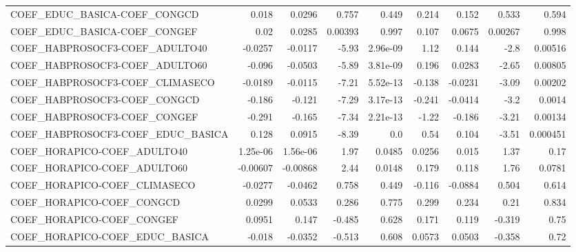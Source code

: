 \begin{tabular}{lrrrrrrrr}
COEF\_EDUC\_BASICA-COEF\_CONGCD         &       0.018 &       0.0296 &   0.757 &    0.449 &      0.214 &       0.152 &        0.533 &         0.594 \\
COEF\_EDUC\_BASICA-COEF\_CONGEF         &        0.02 &       0.0285 & 0.00393 &    0.997 &      0.107 &      0.0675 &      0.00267 &         0.998 \\
COEF\_HABPROSOCF3-COEF\_ADULTO40       &     -0.0257 &      -0.0117 &   -5.93 & 2.96e-09 &       1.12 &       0.144 &         -2.8 &       0.00516 \\
COEF\_HABPROSOCF3-COEF\_ADULTO60       &      -0.096 &      -0.0503 &   -5.89 & 3.81e-09 &      0.196 &      0.0283 &        -2.65 &       0.00805 \\
COEF\_HABPROSOCF3-COEF\_CLIMASECO      &     -0.0189 &      -0.0115 &   -7.21 & 5.52e-13 &     -0.138 &     -0.0231 &        -3.09 &       0.00202 \\
COEF\_HABPROSOCF3-COEF\_CONGCD         &      -0.186 &       -0.121 &   -7.29 & 3.17e-13 &     -0.241 &     -0.0414 &         -3.2 &        0.0014 \\
COEF\_HABPROSOCF3-COEF\_CONGEF         &      -0.291 &       -0.165 &   -7.34 & 2.21e-13 &      -1.22 &      -0.186 &        -3.21 &       0.00134 \\
COEF\_HABPROSOCF3-COEF\_EDUC\_BASICA    &       0.128 &       0.0915 &   -8.39 &      0.0 &       0.54 &       0.104 &        -3.51 &      0.000451 \\
COEF\_HORAPICO-COEF\_ADULTO40          &    1.25e-06 &     1.56e-06 &    1.97 &   0.0485 &     0.0256 &       0.015 &         1.37 &          0.17 \\
COEF\_HORAPICO-COEF\_ADULTO60          &    -0.00607 &     -0.00868 &    2.44 &   0.0148 &      0.179 &       0.118 &         1.76 &        0.0781 \\
COEF\_HORAPICO-COEF\_CLIMASECO         &     -0.0277 &      -0.0462 &   0.758 &    0.449 &     -0.116 &     -0.0884 &        0.504 &         0.614 \\
COEF\_HORAPICO-COEF\_CONGCD            &      0.0299 &       0.0533 &   0.286 &    0.775 &      0.299 &       0.234 &         0.21 &         0.834 \\
COEF\_HORAPICO-COEF\_CONGEF            &      0.0951 &        0.147 &  -0.485 &    0.628 &      0.171 &       0.119 &       -0.319 &          0.75 \\
COEF\_HORAPICO-COEF\_EDUC\_BASICA       &      -0.018 &      -0.0352 &  -0.513 &    0.608 &     0.0573 &      0.0503 &       -0.358 &          0.72 \\

\end{tabular}
